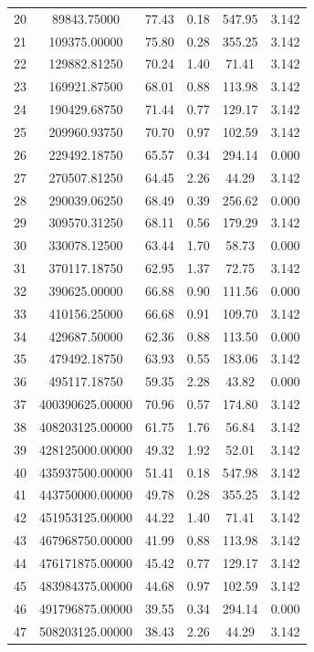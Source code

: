 \documentclass[11pt,twocolumn]{article}
\begin{document}
\begin{table}[t]
\begin{tabular}{ccrccc}
  20 & 89843.75000 & 77.43 & 0.18 & 547.95 & 3.142 \\
  21 & 109375.00000 & 75.80 & 0.28 & 355.25 & 3.142 \\
  22 & 129882.81250 & 70.24 & 1.40 & 71.41 & 3.142 \\
  23 & 169921.87500 & 68.01 & 0.88 & 113.98 & 3.142 \\
  24 & 190429.68750 & 71.44 & 0.77 & 129.17 & 3.142 \\
  25 & 209960.93750 & 70.70 & 0.97 & 102.59 & 3.142 \\
  26 & 229492.18750 & 65.57 & 0.34 & 294.14 & 0.000 \\
  27 & 270507.81250 & 64.45 & 2.26 & 44.29 & 3.142 \\
  28 & 290039.06250 & 68.49 & 0.39 & 256.62 & 0.000 \\
  29 & 309570.31250 & 68.11 & 0.56 & 179.29 & 3.142 \\
  30 & 330078.12500 & 63.44 & 1.70 & 58.73 & 0.000 \\
  31 & 370117.18750 & 62.95 & 1.37 & 72.75 & 3.142 \\
  32 & 390625.00000 & 66.88 & 0.90 & 111.56 & 0.000 \\
  33 & 410156.25000 & 66.68 & 0.91 & 109.70 & 3.142 \\
  34 & 429687.50000 & 62.36 & 0.88 & 113.50 & 0.000 \\
  35 & 479492.18750 & 63.93 & 0.55 & 183.06 & 3.142 \\
  36 & 495117.18750 & 59.35 & 2.28 & 43.82 & 0.000 \\
  37 & 400390625.00000 & 70.96 & 0.57 & 174.80 & 3.142 \\
  38 & 408203125.00000 & 61.75 & 1.76 & 56.84 & 3.142 \\
  39 & 428125000.00000 & 49.32 & 1.92 & 52.01 & 3.142 \\
  40 & 435937500.00000 & 51.41 & 0.18 & 547.98 & 3.142 \\
  41 & 443750000.00000 & 49.78 & 0.28 & 355.25 & 3.142 \\
  42 & 451953125.00000 & 44.22 & 1.40 & 71.41 & 3.142 \\
  43 & 467968750.00000 & 41.99 & 0.88 & 113.98 & 3.142 \\
  44 & 476171875.00000 & 45.42 & 0.77 & 129.17 & 3.142 \\
  45 & 483984375.00000 & 44.68 & 0.97 & 102.59 & 3.142 \\
  46 & 491796875.00000 & 39.55 & 0.34 & 294.14 & 0.000 \\
  47 & 508203125.00000 & 38.43 & 2.26 & 44.29 & 3.142 \\

\end{tabular}
\end{table}
\end{document}
